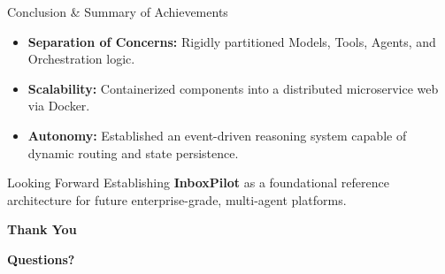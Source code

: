 \documentclass[aspectratio=169, xcolor=table]{beamer}
\begin{document}
\begin{frame}{Conclusion \& Summary of Achievements}
    \begin{itemize}
        \item \textbf{Separation of Concerns:} Rigidly partitioned Models, Tools, Agents, and Orchestration logic.
        \item \textbf{Scalability:} Containerized components into a distributed microservice web via Docker.
        \item \textbf{Autonomy:} Established an event-driven reasoning system capable of dynamic routing and state persistence.
    \end{itemize}
    
    \vspace{0.5cm}
    \begin{block}{Looking Forward}
        Establishing \textbf{InboxPilot} as a foundational reference architecture for future enterprise-grade, multi-agent platforms.
    \end{block}
\end{frame}

\begin{frame}[plain]
    \centering
    \vspace{2cm}
    \Huge \textbf{Thank You}
    
    \vspace{1cm}
    \Large \textbf{Questions?}
\end{frame}
\end{document}
